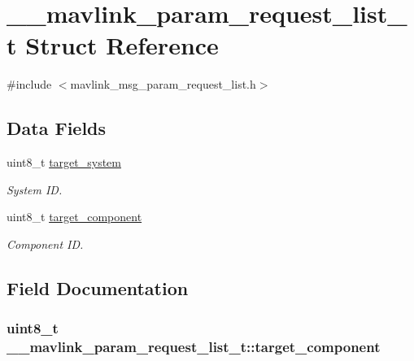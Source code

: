 \hypertarget{struct____mavlink__param__request__list__t}{\section{\+\_\+\+\_\+mavlink\+\_\+param\+\_\+request\+\_\+list\+\_\+t Struct Reference}
\label{struct____mavlink__param__request__list__t}
}


{\ttfamily \#include $<$mavlink\+\_\+msg\+\_\+param\+\_\+request\+\_\+list.\+h$>$}

\subsection*{Data Fields}
\begin{DoxyCompactItemize}
\item 
uint8\+\_\+t \hyperlink{struct____mavlink__param__request__list__t_aae3ba45d3ff75c3603ec6bf4eb58b244}{target\+\_\+system}
\begin{DoxyCompactList}\small\item\em System I\+D. \end{DoxyCompactList}\item 
uint8\+\_\+t \hyperlink{struct____mavlink__param__request__list__t_adf6602f61af11ec222fdabd850abdf2d}{target\+\_\+component}
\begin{DoxyCompactList}\small\item\em Component I\+D. \end{DoxyCompactList}\end{DoxyCompactItemize}


\subsection{Field Documentation}
\hypertarget{struct____mavlink__param__request__list__t_adf6602f61af11ec222fdabd850abdf2d}{
\subsubsection[{target\+\_\+component}]{\setlength{\rightskip}{0pt plus 5cm}uint8\+\_\+t \+\_\+\+\_\+mavlink\+\_\+param\+\_\+request\+\_\+list\+\_\+t\+::target\+\_\+component}}\label{struct____mavlink__param__request__list__t_adf6602f61af11ec222fdabd850abdf2d}


